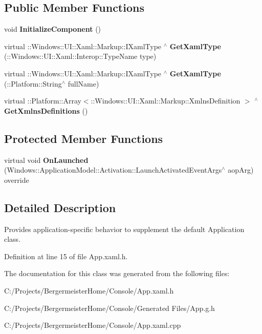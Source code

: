 \subsection*{Public Member Functions}
\begin{DoxyCompactItemize}
\item 
\mbox{\label{class_console_1_1_app_aeaadf4574f8c5b5131ef9d076e4771f2}} 
void {\bfseries Initialize\+Component} ()
\item 
\mbox{\label{class_console_1_1_app_ab264b34bbb46988b5b66c03705aa27ec}} 
virtual \+::Windows\+::\+U\+I\+::\+Xaml\+::\+Markup\+::\+I\+Xaml\+Type $^\wedge$ {\bfseries Get\+Xaml\+Type} (\+::Windows\+::\+U\+I\+::\+Xaml\+::\+Interop\+::\+Type\+Name type)
\item 
\mbox{\label{class_console_1_1_app_ab3e42f369ce3625ca5c88be3364761cb}} 
virtual \+::Windows\+::\+U\+I\+::\+Xaml\+::\+Markup\+::\+I\+Xaml\+Type $^\wedge$ {\bfseries Get\+Xaml\+Type} (\+::Platform\+::\+String$^\wedge$ full\+Name)
\item 
\mbox{\label{class_console_1_1_app_a9ff31ca8f383ec11f15e945999ef285e}} 
virtual \+::Platform\+::\+Array$<$\+::Windows\+::\+U\+I\+::\+Xaml\+::\+Markup\+::\+Xmlns\+Definition $>$ $^\wedge$ {\bfseries Get\+Xmlns\+Definitions} ()
\end{DoxyCompactItemize}
\subsection*{Protected Member Functions}
\begin{DoxyCompactItemize}
\item 
\mbox{\label{class_console_1_1_app_a850b50800225e29269fa01831d1af441}} 
virtual void {\bfseries On\+Launched} (Windows\+::\+Application\+Model\+::\+Activation\+::\+Launch\+Activated\+Event\+Args$^\wedge$ aop\+Arg) override
\end{DoxyCompactItemize}


\subsection{Detailed Description}
Provides application-\/specific behavior to supplement the default Application class. 



Definition at line 15 of file App.\+xaml.\+h.



The documentation for this class was generated from the following files\+:\begin{DoxyCompactItemize}
\item 
C\+:/\+Projects/\+Bergermeister\+Home/\+Console/App.\+xaml.\+h\item 
C\+:/\+Projects/\+Bergermeister\+Home/\+Console/\+Generated Files/App.\+g.\+h\item 
C\+:/\+Projects/\+Bergermeister\+Home/\+Console/App.\+xaml.\+cpp\end{DoxyCompactItemize}
